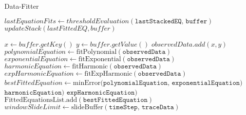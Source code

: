 \documentclass{article}
\newcommand{\vars}{\texttt}
\newcommand{\func}{\textrm}
\begin{document}
	\begin{algorithm}
		\caption{Data-Fitter}
		\label{dataFitter}
		\begin{algorithmic}[1]
			\State $lastEquationFits \gets thresholdEvaluation(\vars{lastStackedEQ, buffer})$
				\State $updateStack(lastFittedEQ, buffer)$
				
			\Else
			
			\State $x\gets buffer.getKey()$ 
			\State $y\gets buffer.getValue()$ 
			\State $observedData.add(x,y)$
			\EndFor
%			
			\State $polynomialEquation\gets \func{fitPolynomial}(\vars{observedData})$
			\State $exponentialEquation\gets \func{fitExponential}(\vars{observedData})$
			\State $harmonicEquation\gets \func{fitHarmonic}(\vars{observedData})$
			\State $expHarmonicEquation\gets \func{fitExpHarmonic}(\vars{observedData})$
			\State $bestFittedEquation \gets\func {minError} (\vars{polynomialEquation,}$ 
			\State $\vars{exponentialEquation}) $
			\State $\vars{harmonicEquation}) $
			\State $\vars{expHarmonicEquation}) $
			\State $\func{FittedEquationsList.add}(\vars{bestFittedEquation})$
			\EndIf
			\State $ windowSlideLimit \gets \func{slideBuffer}(\vars{timeStep, traceData})$
			\EndWhile
			
			\EndProcedure
		\end{algorithmic}
	\end{algorithm}
\end{document}
